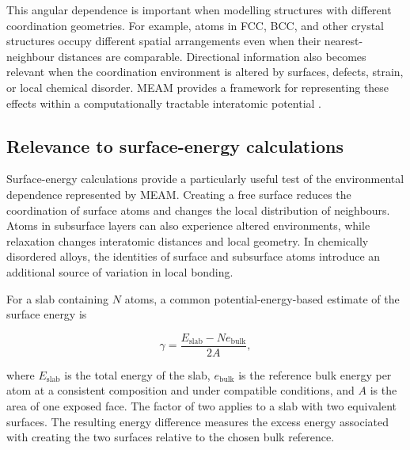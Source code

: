 This angular dependence is important when modelling structures with different coordination geometries. For example, 
atoms in FCC, BCC, and other crystal structures occupy different spatial arrangements even when their nearest-neighbour 
distances are comparable. Directional information also becomes relevant when the coordination environment is altered by 
surfaces, defects, strain, or local chemical disorder. MEAM provides a framework for representing these effects within 
a computationally tractable interatomic potential \cite{baskes1992meam}.

\subsection{Relevance to surface-energy calculations}

Surface-energy calculations provide a particularly useful test of the environmental dependence represented by MEAM. Creating a free surface 
reduces the coordination of surface atoms and changes the local distribution of neighbours. Atoms in subsurface layers can also experience 
altered environments, while relaxation changes interatomic distances and local geometry. In chemically disordered alloys, the identities of 
surface and subsurface atoms introduce an additional source of variation in local bonding.

For a slab containing $N$ atoms, a common potential-energy-based estimate of the surface energy is

\begin{equation}
    \gamma =
    \frac{E_{\mathrm{slab}}-N e_{\mathrm{bulk}}}{2A},
    \label{eq:surface-energy}
\end{equation}

where $E_{\mathrm{slab}}$ is the total energy of the slab, $e_{\mathrm{bulk}}$ is the reference bulk energy per atom at a consistent composition and 
under compatible conditions, and $A$ is the area of one exposed face. The factor of two applies to a slab with two equivalent surfaces. The resulting 
energy difference measures the excess energy associated with creating the two surfaces relative to the chosen bulk reference.